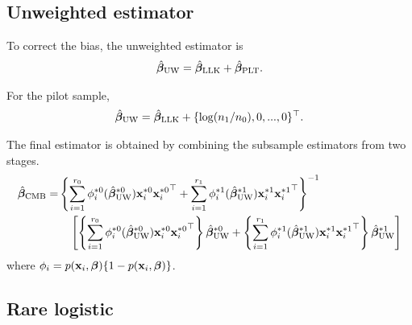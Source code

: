 \documentclass[letterpaper,12pt,hidelinks]{article}
\begin{document}
\subsection{Unweighted estimator}

To correct the bias, the unweighted estimator is 
\begin{align*}
    \hat{\boldsymbol{\beta}}_{\mathrm{UW}} = \hat{\boldsymbol{\beta}}_{\mathrm{LLK}} + \hat{\boldsymbol{\beta}}_{\mathrm{PLT}}.
\end{align*}

For the pilot sample, 
\begin{align*}
    \hat{\boldsymbol{\beta}}_{\mathrm{UW}} = \hat{\boldsymbol{\beta}}_{\mathrm{LLK}} + \{\log(n_1/n_0), 0, ..., 0\}^{\top}.
\end{align*}

The final estimator is obtained by combining the subsample estimators from two 
stages.
\begin{align*}
    \hat{\boldsymbol{\beta}}_{\mathrm{CMB}} = &\left\{\sum_{i=1}^{r_0} \phi_i^{*0}(\hat{\boldsymbol{\beta}}_{\mathrm{UW}}^{*0}) \mathbf{x}_i^{*0} {\mathbf{x}_i^{*0}}^{\top} + \sum_{i=1}^{r_1} \phi_i^{*1}(\hat{\boldsymbol{\beta}}_{\mathrm{UW}}^{*1}) \mathbf{x}_i^{*1} {\mathbf{x}_i^{*1}}^{\top}\right\}^{-1}\\
    &\quad \left[ \left\{\sum_{i=1}^{r_0} \phi_i^{*0}(\hat{\boldsymbol{\beta}}_{\mathrm{UW}}^{*0}) \mathbf{x}_i^{*0} {\mathbf{x}_i^{*0}}^{\top}\right\}\hat{\boldsymbol{\beta}}_{\mathrm{UW}}^{*0} + \left\{\sum_{i=1}^{r_1} \phi_i^{*1}(\hat{\boldsymbol{\beta}}_{\mathrm{UW}}^{*1}) \mathbf{x}_i^{*1} {\mathbf{x}_i^{*1}}^{\top}\right\}\hat{\boldsymbol{\beta}}_{\mathrm{UW}}^{*1} \right]
\end{align*}
where $\phi_i = p(\mathbf{x}_i, \boldsymbol{\beta})\{ 1 - p(\mathbf{x}_i, \boldsymbol{\beta})\}$.

\subsection{Rare logistic}
\end{document}
